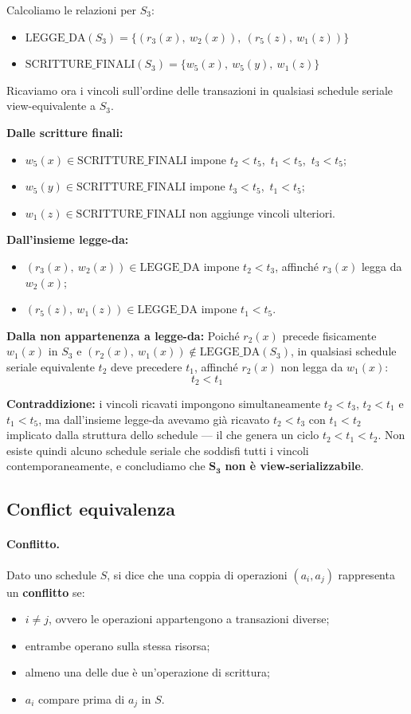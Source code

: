 Calcoliamo le relazioni per $S_3$:
\begin{itemize}
	\item $\text{LEGGE\_DA}(S_3) = \{(r_3(x),\ w_2(x)),\ (r_5(z),\ w_1(z))\}$
	\item $\text{SCRITTURE\_FINALI}(S_3) = \{w_5(x),\ w_5(y),\ w_1(z)\}$
\end{itemize}

Ricaviamo ora i vincoli sull'ordine delle transazioni in qualsiasi schedule seriale view-equivalente a $S_3$.

\textbf{Dalle scritture finali:}
\begin{itemize}
	\item $w_5(x) \in \text{SCRITTURE\_FINALI}$ impone $t_2 < t_5$,\ $t_1 < t_5$,\ $t_3 < t_5$;
	\item $w_5(y) \in \text{SCRITTURE\_FINALI}$ impone $t_3 < t_5$,\ $t_1 < t_5$;
	\item $w_1(z) \in \text{SCRITTURE\_FINALI}$ non aggiunge vincoli ulteriori.
\end{itemize}

\textbf{Dall'insieme legge-da:}
\begin{itemize}
	\item $(r_3(x),\ w_2(x)) \in \text{LEGGE\_DA}$ impone $t_2 < t_3$, affinché $r_3(x)$ legga da $w_2(x)$;
	\item $(r_5(z),\ w_1(z)) \in \text{LEGGE\_DA}$ impone $t_1 < t_5$.
\end{itemize}

\textbf{Dalla non appartenenza a legge-da:}
Poiché $r_2(x)$ precede fisicamente $w_1(x)$ in $S_3$ e $(r_2(x),\ w_1(x)) \notin \text{LEGGE\_DA}(S_3)$, in qualsiasi schedule seriale equivalente $t_2$ deve precedere $t_1$, affinché $r_2(x)$ non legga da $w_1(x)$:
\[
t_2 < t_1
\]

\textbf{Contraddizione:} i vincoli ricavati impongono simultaneamente $t_2 < t_3$, $t_2 < t_1$ e $t_1 < t_5$, ma dall'insieme legge-da avevamo già ricavato $t_2 < t_3$ con $t_1 < t_2$ implicato dalla struttura dello schedule — il che genera un ciclo $t_2 < t_1 < t_2$. Non esiste quindi alcuno schedule seriale che soddisfi tutti i vincoli contemporaneamente, e concludiamo che $\mathbf{S_3}$ \textbf{non è view-serializzabile}.
\subsection{Conflict equivalenza}

\paragraph{Conflitto.}
Dato uno schedule $S$, si dice che una coppia di operazioni $(a_i, a_j)$ rappresenta un \textbf{conflitto} se:
\begin{itemize}
	\item $i \neq j$, ovvero le operazioni appartengono a transazioni diverse;
	\item entrambe operano sulla stessa risorsa;
	\item almeno una delle due è un'operazione di scrittura;
	\item $a_i$ compare prima di $a_j$ in $S$.
\end{itemize}

